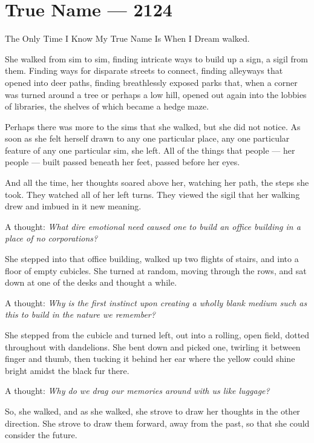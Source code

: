 \hypertarget{true-name-2124}{%
\chapter{True Name — 2124}\label{true-name-2124}}

The Only Time I Know My True Name Is When I Dream walked.

She walked from sim to sim, finding intricate ways to build up a sign, a sigil from them. Finding ways for disparate streets to connect, finding alleyways that opened into deer paths, finding breathlessly exposed parks that, when a corner was turned around a tree or perhaps a low hill, opened out again into the lobbies of libraries, the shelves of which became a hedge maze.

Perhaps there was more to the sims that she walked, but she did not notice. As soon as she felt herself drawn to any one particular place, any one particular feature of any one particular sim, she left. All of the things that people — her people — built passed beneath her feet, passed before her eyes.

And all the time, her thoughts soared above her, watching her path, the steps she took. They watched all of her left turns. They viewed the sigil that her walking drew and imbued in it new meaning.

A thought: \emph{What dire emotional need caused one to build an office building in a place of no corporations?}

She stepped into that office building, walked up two flights of stairs, and into a floor of empty cubicles. She turned at random, moving through the rows, and sat down at one of the desks and thought a while.

A thought: \emph{Why is the first instinct upon creating a wholly blank medium such as this to build in the nature we remember?}

She stepped from the cubicle and turned left, out into a rolling, open field, dotted throughout with dandelions. She bent down and picked one, twirling it between finger and thumb, then tucking it behind her ear where the yellow could shine bright amidst the black fur there.

A thought: \emph{Why do we drag our memories around with us like luggage?}

So, she walked, and as she walked, she strove to draw her thoughts in the other direction. She strove to draw them forward, away from the past, so that she could consider the future.

